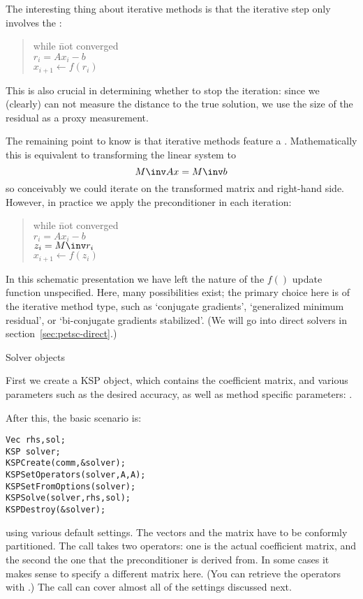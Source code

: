 The interesting thing about iterative methods is that the iterative step
only involves the :

\begin{quote}
  \begin{tabbing}
    while \=not converged\\
    \> $r_i = Ax_i-b$\\
    \> $x_{i+1}\leftarrow f(r_i)$
  \end{tabbing}
\end{quote}

This  is also crucial in determining whether to stop the iteration:
since we (clearly) can not measure the distance to the true solution, we use
the size of the residual as a proxy measurement.

The remaining point to know is that iterative methods feature a .
Mathematically this is equivalent to transforming the linear system to
\[ M\inv Ax=M\inv b \]
so conceivably we could iterate on the transformed matrix and right-hand side.
However, in practice we apply the preconditioner in each iteration:

\begin{quote}
  \begin{tabbing}
    while \=not converged\\
    \> $r_i = Ax_i-b$\\
    \> $z_i = M\inv r_i$\\
    \> $x_{i+1}\leftarrow f(z_i)$
  \end{tabbing}
\end{quote}

In this schematic presentation we have left the nature of the $f()$ update
function unspecified. Here, many possibilities exist; the primary
choice here is of the iterative method type, such as `conjugate gradients',
`generalized minimum residual', or `bi-conjugate gradients stabilized'.
(We will go into direct solvers in section~\ref{sec:petsc-direct}.)

 {Solver objects}

First we create a KSP object, which contains the coefficient matrix,
and various parameters such as the desired accuracy,
as well as method specific parameters:
%
.

After this, the basic scenario is:
\begin{lstlisting}
Vec rhs,sol;
KSP solver;
KSPCreate(comm,&solver);
KSPSetOperators(solver,A,A);
KSPSetFromOptions(solver);
KSPSolve(solver,rhs,sol);
KSPDestroy(&solver);
\end{lstlisting}
using various default settings. The vectors and the matrix have to be
conformly partitioned.
The  call
takes two operators: one is the actual coefficient matrix, and the second
the one that the preconditioner is derived from.
In some cases it makes sense
to specify a different matrix here.
(You can retrieve the operators with .)
The call  can cover almost all of the 
settings discussed next.

